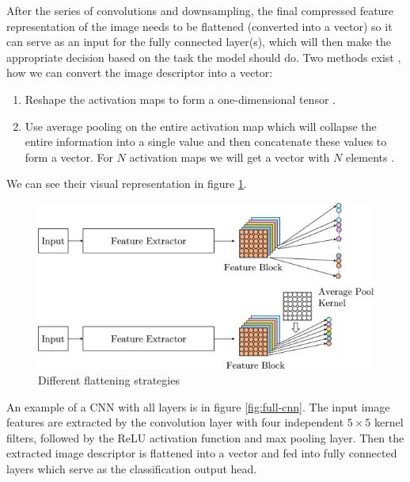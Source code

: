 After the series of convolutions and downsampling, the final compressed feature representation of the image needs to be flattened (converted into a vector) so it can serve as an input for the fully connected layer(s), which will then make the appropriate decision based on the task the model should do. Two methods exist \cite{Santosh2022-2}, how we can convert the image descriptor into a vector:

\begin{enumerate}
    \item Reshape the activation maps to form a one-dimensional tensor \cite{Krizhevsky2012, LeCun2015-2}.
    \item Use average pooling on the entire activation map which will collapse the entire information into a single value and then concatenate these values to form a vector. For $N$ activation maps we will get a vector with $N$ elements \cite{He2016, Szegedy2015}.
\end{enumerate}

We can see their visual representation in figure \ref{fig:flatenning}.

\begin{figure}[H]
\begin{centering}
\includegraphics[width=12cm]{assets/images/flattening.jpg}
\par\end{centering}
\caption{Different flattening strategies \cite{Santosh2022-2}}
\label{fig:flatenning}
\end{figure}

An example of a CNN with all layers is in figure \ref{fig:full-cnn}. The input image features are extracted by the convolution layer with four independent $5\!\times\!5$ kernel filters, followed by the ReLU activation function and max pooling layer. Then the extracted image descriptor is flattened into a vector and fed into fully connected layers which serve as the classification output head.

